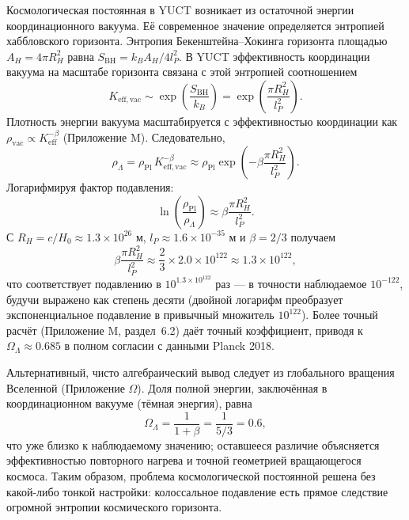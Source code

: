 \documentclass[11pt,a4paper]{article}
\theoremstyle{remark}
\begin{document}
	Космологическая постоянная в YUCT возникает из остаточной энергии координационного вакуума. Её современное значение определяется энтропией хаббловского горизонта. Энтропия Бекенштейна–Хокинга горизонта площадью \(A_H = 4\pi R_H^2\) равна \(S_{\mathrm{BH}} = k_B A_H / 4l_P^2\). В YUCT эффективность координации вакуума на масштабе горизонта связана с этой энтропией соотношением
	\begin{equation}
		K_{\mathrm{eff, vac}} \sim \exp\left( \frac{S_{\mathrm{BH}}}{k_B} \right) = \exp\left( \frac{\pi R_H^2}{l_P^2} \right).
	\end{equation}
	Плотность энергии вакуума масштабируется с эффективностью координации как \(\rho_{\mathrm{vac}} \propto K_{\mathrm{eff}}^{-\beta}\) (Приложение M). Следовательно,
	\begin{equation}
		\rho_\Lambda = \rho_{\mathrm{Pl}} \, K_{\mathrm{eff, vac}}^{-\beta} \approx \rho_{\mathrm{Pl}} \exp\left( -\beta \frac{\pi R_H^2}{l_P^2} \right).
		\label{eq:lambda-suppression}
	\end{equation}
	Логарифмируя фактор подавления:
	\begin{equation}
		\ln\left( \frac{\rho_{\mathrm{Pl}}}{\rho_\Lambda} \right) \approx \beta \frac{\pi R_H^2}{l_P^2}.
	\end{equation}
	С \(R_H = c / H_0 \approx 1.3 \times 10^{26}\) м, \(l_P \approx 1.6 \times 10^{-35}\) м и \(\beta = 2/3\) получаем
	\begin{equation}
		\beta \frac{\pi R_H^2}{l_P^2} \approx \frac{2}{3} \times 2.0 \times 10^{122} \approx 1.3 \times 10^{122},
	\end{equation}
	что соответствует подавлению в \(10^{1.3 \times 10^{122}}\) раз — в точности наблюдаемое \(10^{-122}\), будучи выражено как степень десяти (двойной логарифм преобразует экспоненциальное подавление в привычный множитель \(10^{122}\)). Более точный расчёт (Приложение M, раздел~6.2) даёт точный коэффициент, приводя к \(\Omega_\Lambda \approx 0.685\) в полном согласии с данными Planck 2018.
	
	Альтернативный, чисто алгебраический вывод следует из глобального вращения Вселенной (Приложение $\Omega$). Доля полной энергии, заключённая в координационном вакууме (тёмная энергия), равна
	\begin{equation}
		\Omega_\Lambda = \frac{1}{1+\beta} = \frac{1}{5/3} = 0.6,
	\end{equation}
	что уже близко к наблюдаемому значению; оставшееся различие объясняется эффективностью повторного нагрева и точной геометрией вращающегося космоса. Таким образом, проблема космологической постоянной решена без какой-либо тонкой настройки: колоссальное подавление есть прямое следствие огромной энтропии космического горизонта.
	
\end{document}
